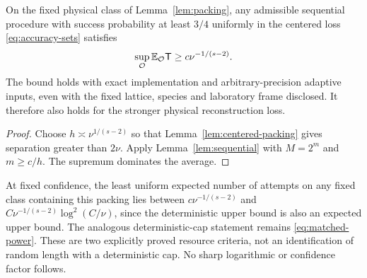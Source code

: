 \begin{theorem}\label{thm:expected}
On the fixed physical class of Lemma~\ref{lem:packing}, any admissible
sequential procedure with success probability at least $3/4$ uniformly
in the centered loss \eqref{eq:accuracy-sets} satisfies
\begin{equation}\label{eq:expected-lower}
                 \sup_{\mathcal O}\mathbb E_{\mathcal O}\mathsf T
                         \ge c\nu^{-1/(s-2)}.
\end{equation}
The bound holds with exact implementation and arbitrary-precision
adaptive inputs, even with the fixed lattice, species and laboratory
frame disclosed. It therefore also holds for the stronger physical
reconstruction loss.
\end{theorem}
\begin{proof}
Choose $h\asymp\nu^{1/(s-2)}$ so that Lemma~\ref{lem:centered-packing}
gives separation greater than $2\nu$. Apply Lemma~\ref{lem:sequential}
with $M=2^m$ and $m\ge c/h$. The supremum dominates the average.
\end{proof}

At fixed confidence, the least uniform expected number of attempts on
any fixed class containing this packing lies between
$c\nu^{-1/(s-2)}$ and
$C\nu^{-1/(s-2)}\log^2(C/\nu)$, since the deterministic upper bound
is also an expected upper bound. The analogous deterministic-cap
statement remains \eqref{eq:matched-power}. These are two explicitly
proved resource criteria, not an identification of random length with
a deterministic cap. No sharp logarithmic or confidence factor follows.
